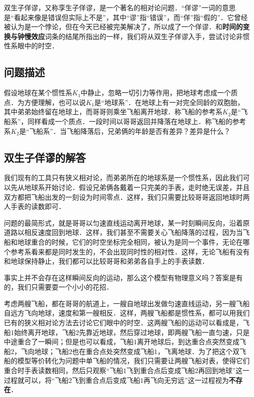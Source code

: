 
双生子佯谬，又称孪生子佯谬，是一个著名的相对论问题．“佯谬”一词的意思是“看起来像是错误但实际上不是”，其中“谬”指“错误”，而“佯”指“假的”．它曾经被认为是一个悖论，但在今天已经被完美解决了，所以成了一个佯谬．和\textbf{时间的变换与钟慢效应}词条的结尾所指出的一样，我们将从双生子佯谬入手，尝试讨论非惯性系眼中的时空．

\subsection{问题描述}

假设地球在某个惯性系$K_1$中静止，忽略一切引力等作用，把地球考虑成一个质点．为方便理解，也可以说$K_1$是“地球系”．在地球上有一对完全同龄的双胞胎，其中弟弟始终留在地球上，而哥哥则乘坐飞船离开地球．称飞船的参考系$K_2$是“飞船系”，同样看成一个质点．一段时间以哥哥返回并降落在地球上．称飞船的参考系$K_2$是“飞船系”．当飞船降落后，兄弟俩的年龄是否有差异？差异是什么？

\subsection{双生子佯谬的解答}

我们现有的工具只有狭义相对论，而弟弟所在的地球系是一个惯性系，因此我们可以先从地球系开始讨论．假设兄弟俩各戴着一只完美的手表，走时绝无误差，并且双方都把飞船出发的一刻设为时间零点．这样，我们只需要比较哥哥返回地球时两人手表的读数即可．

问题的最简形式，就是哥哥以匀速直线运动离开地球，某一时刻瞬间反向，沿着原道路以相反速度回到地球．这样，我们甚至不需要关心飞船降落的过程，因为当飞船和地球重合的时候，它们的时空坐标完全相同，被认为是同一个事件，无论在哪个参考系看来都是同时发生的，不会出现同时性的相对性．这样，无论飞船有没有和地球保持静止，我们都可以比较哥哥和弟弟各自手上的手表读数．

事实上并不会存在这样瞬间反向的运动，那么这个模型有物理意义吗？答案是有的，我们只需要耍一个小小的花招．

考虑两艘飞船，都在哥哥的航道上，一艘自地球出发做匀速直线运动，另一艘飞船自远方飞向地球，速度和第一艘相反．这样，两艘飞船都是惯性系，都可以用我们已有的狭义相对论方法去讨论它们眼中的时空．这两艘飞船的运动可以看成是，飞船$1$始终离开地球，飞船$2$先靠近地球，然后穿过地球，即两艘飞船一直匀速，只是中途重合了一瞬间；但是也可以看成，飞船$1$离开地球后，到达重合点突然变成飞船$2$，飞向地球；飞船$2$也在重合点处突然变成飞船$1$，飞离地球．为了把这个双飞船的模型等价转化为问题中单飞船的情况，我们只需要让两艘飞船对表，使得它们重合时手表读数相同，然后只观察“飞船$1$飞到重合点后变成飞船$2$再回到地球”这一过程就可以，将“飞船$2$飞到重合点后变成飞船$1$再飞向无穷远”这一过程视为\textbf{不存在}．


